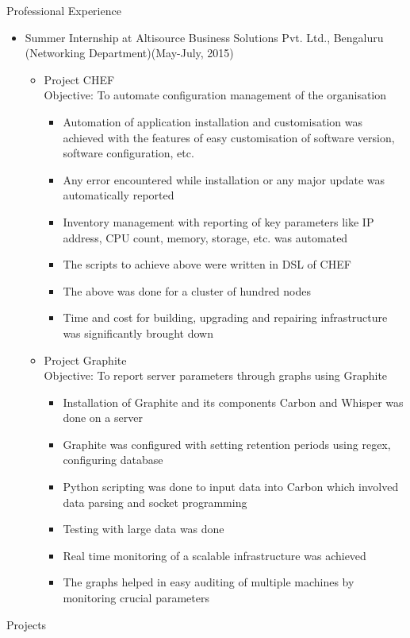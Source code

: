 \documentclass{article}
\begin{document}
\vspace{10pt}
{\Large Professional Experience}
\begin{itemize}
\item {\large Summer Internship at Altisource Business Solutions Pvt. Ltd., Bengaluru}\newline
(Networking Department)\hfill (May-July, 2015)
	\begin{itemize}
	\item Project CHEF\vspace{0.1cm}\\
	\vspace{0.1cm}
	Objective: To automate configuration management of the organisation
	\begin{itemize}
	\item Automation of application installation and customisation was achieved with the features of easy customisation of software version, software configuration, etc.
	\item Any error encountered while installation or any major update was automatically reported
	\item Inventory management with reporting  of key parameters like IP address, CPU count, memory, storage, etc. was automated
    \item The scripts to achieve above were written in DSL of CHEF 
	\item The above was done for a cluster of hundred nodes 
	\item Time and cost for building, upgrading and repairing infrastructure was significantly brought down 	\end{itemize}
	\vspace{0.6cm}
	\item Project Graphite\vspace{0.1cm}\\
	\vspace{0.1cm}
	Objective: To report server parameters through graphs using Graphite
	\begin{itemize}
	\item Installation of Graphite and its components Carbon and Whisper was done on a server
	\item Graphite was configured with setting retention periods using regex, configuring database
	\item Python scripting was done to input data into Carbon which involved data parsing and socket programming
	\item Testing with large data was done
	\item Real time monitoring of a scalable infrastructure was achieved
	\item The graphs helped in easy auditing of multiple machines by monitoring crucial parameters	\end{itemize}
	
	\end{itemize}
\end{itemize}
\vspace{100pt}
{\Large Projects}
\end{document}
